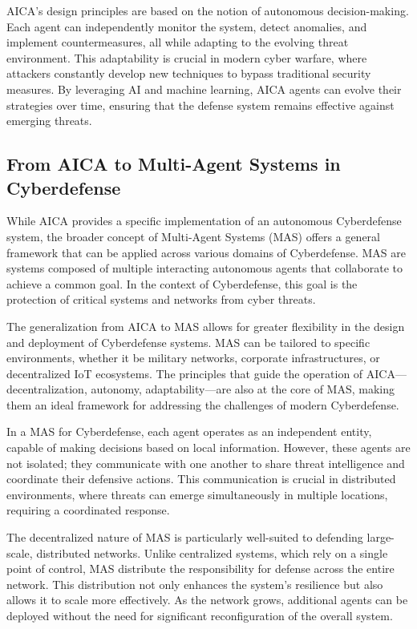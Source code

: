 AICA's design principles are based on the notion of autonomous decision-making. Each agent can independently monitor the system, detect anomalies, and implement countermeasures, all while adapting to the evolving threat environment. This adaptability is crucial in modern cyber warfare, where attackers constantly develop new techniques to bypass traditional security measures. By leveraging AI and machine learning, AICA agents can evolve their strategies over time, ensuring that the defense system remains effective against emerging threats.

\subsection{From AICA to Multi-Agent Systems in Cyberdefense}

While AICA provides a specific implementation of an autonomous Cyberdefense system, the broader concept of Multi-Agent Systems (MAS) offers a general framework that can be applied across various domains of Cyberdefense. MAS are systems composed of multiple interacting autonomous agents that collaborate to achieve a common goal. In the context of Cyberdefense, this goal is the protection of critical systems and networks from cyber threats.

The generalization from AICA to MAS allows for greater flexibility in the design and deployment of Cyberdefense systems. MAS can be tailored to specific environments, whether it be military networks, corporate infrastructures, or decentralized IoT ecosystems. The principles that guide the operation of AICA—decentralization, autonomy, adaptability—are also at the core of MAS, making them an ideal framework for addressing the challenges of modern Cyberdefense.

In a MAS for Cyberdefense, each agent operates as an independent entity, capable of making decisions based on local information. However, these agents are not isolated; they communicate with one another to share threat intelligence and coordinate their defensive actions. This communication is crucial in distributed environments, where threats can emerge simultaneously in multiple locations, requiring a coordinated response.

The decentralized nature of MAS is particularly well-suited to defending large-scale, distributed networks. Unlike centralized systems, which rely on a single point of control, MAS distribute the responsibility for defense across the entire network. This distribution not only enhances the system's resilience but also allows it to scale more effectively. As the network grows, additional agents can be deployed without the need for significant reconfiguration of the overall system.

